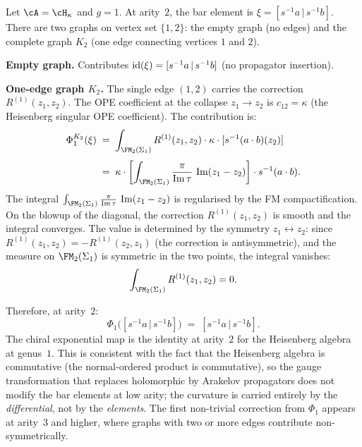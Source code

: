 \begin{computation}
\label{comp:Phi-1-heisenberg}

Let $\cA = \cH_\kappa$ and $g = 1$. At arity~$2$, the bar element
is $\xi = [s^{-1}a \,|\, s^{-1}b]$. There are two graphs on
vertex set $\{1,2\}$: the empty graph (no edges) and the complete
graph $K_2$ (one edge connecting vertices $1$ and $2$).

\smallskip\noindent
\textbf{Empty graph.} Contributes $\mathrm{id}(\xi) = [s^{-1}a \,|\, s^{-1}b]$
(no propagator insertion).

\smallskip\noindent
\textbf{One-edge graph $K_2$.} The single edge $(1,2)$ carries the
correction $R^{(1)}(z_1,z_2)$. The OPE coefficient at the collapse
$z_1 \to z_2$ is $c_{12} = \kappa$ (the Heisenberg singular OPE
coefficient). The contribution is:
\begin{align}\label{eq:Phi-1-K2}
 \Phi_1^{K_2}(\xi)
 &\;=\;
 \int_{\FM_2(\Sigma_1)}
 R^{(1)}(z_1,z_2) \cdot \kappa \cdot
 [s^{-1}(a \cdot b)(z_2)]
 \notag\\[3pt]
 &\;=\;
 \kappa \cdot
 \biggl[
 \int_{\FM_2(\Sigma_1)}
 \frac{\pi}{\operatorname{Im}\tau}\,
 \operatorname{Im}(z_1-z_2)
 \biggr]
 \cdot s^{-1}(a \cdot b).
\end{align}
The integral
$\int_{\FM_2(\Sigma_1)} \frac{\pi}{\operatorname{Im}\tau}\,
\operatorname{Im}(z_1-z_2)$ is regularised by the FM compactification.
On the blowup of the diagonal, the correction $R^{(1)}(z_1,z_2)$
is smooth and the integral converges. The value is determined by
the symmetry $z_1 \leftrightarrow z_2$: since
$R^{(1)}(z_1,z_2) = -R^{(1)}(z_2,z_1)$ (the correction is
antisymmetric), and the measure on $\FM_2(\Sigma_1)$ is symmetric
in the two points, the integral vanishes:
\begin{equation}\label{eq:Phi-1-K2-vanishes}
 \int_{\FM_2(\Sigma_1)}
 R^{(1)}(z_1,z_2) = 0.
\end{equation}

Therefore, at arity~$2$:
\begin{equation}\label{eq:Phi-1-arity-2}
 \Phi_1\bigl([s^{-1}a \,|\, s^{-1}b]\bigr)
 \;=\;
 [s^{-1}a \,|\, s^{-1}b].
\end{equation}
The chiral exponential map is the identity at arity~$2$ for the
Heisenberg algebra at genus~$1$. This is consistent with the fact
that the Heisenberg algebra is commutative (the normal-ordered
product is commutative), so the gauge transformation that replaces
holomorphic by Arakelov propagators does not modify the bar elements
at low arity; the curvature is carried entirely by the
\emph{differential}, not by the \emph{elements}. The first
non-trivial correction from $\Phi_1$ appears at arity~$3$ and
higher, where graphs with two or more edges contribute
non-symmetrically.
\end{computation}



